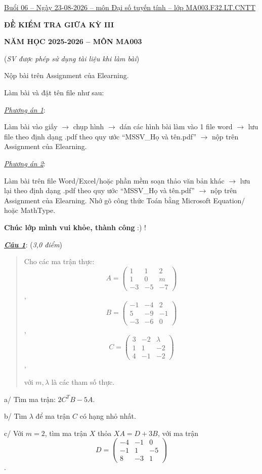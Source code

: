 \documentclass[12pt,a4paper]{article}
\newcommand{\ul}[1]{\uline{#1}}
\begin{document}
\ul{Buổi 06 -- Ngày 23-08-2026 -- môn Đại số tuyến tính -- lớp MA003.F32.LT.CNTT}

\textbf{ĐỀ KIỂM TRA GIỮA KỲ III}

\textbf{NĂM HỌC 2025-2026 -- MÔN MA003}

(\emph{SV được phép sử dụng tài liệu khi làm bài})

Nộp bài trên Assignment của Elearning.

Làm bài và đặt tên file như sau:

\emph{\ul{Phương án 1}}:

Làm bài vào giấy $\rightarrow$ chụp hình $\rightarrow$ dán các hình bài làm vào 1 file word $\rightarrow$
lưu file theo định dạng .pdf theo quy ước ``MSSV\_Họ và tên.pdf'' $\rightarrow$ nộp
trên Assignment của Elearning.

\emph{\ul{Phương án 2}}:

Làm bài trên file Word/Excel/hoặc phần mềm soạn thảo văn bản khác $\rightarrow$ lưu
lại theo định dạng .pdf theo quy ước ``MSSV\_Họ và tên.pdf'' $\rightarrow$ nộp trên
Assignment của Elearning. Nhớ gõ công thức Toán bằng Microsoft Equation/
hoặc MathType.

\textbf{Chúc lớp mình vui khỏe, thành công} :) !

\emph{\textbf{\ul{Câu 1}}}: (\emph{3,0 điểm})

\begin{quote}
Cho các ma trận thực: \[A = \begin{pmatrix} 1 & 1 & 2 \\ 1 & 0 & m \\ -3 & -5 & -7 \end{pmatrix}\],
\[B = \begin{pmatrix} -1 & -4 & 2 \\ 5 & -9 & -1 \\ -3 & -6 & 0 \end{pmatrix}\],
\[C = \begin{pmatrix} 3 & -2 & \lambda \\ 1 & 1 & -2 \\ 4 & -1 & -2 \end{pmatrix}\],

với $m, \lambda$ là các tham số
thực.
\end{quote}

a/ Tìm ma trận: $2C^T B - 5A$.

b/ Tìm $\lambda$ để ma trận
$C$ có hạng nhỏ nhất.

c/ Với $m = 2$, tìm ma trận
$X$ thỏa
$XA = D + 3B$, với ma trận
\[D = \begin{pmatrix} -4 & -1 & 0 \\ -1 & 1 & -5 \\ 8 & -3 & 1 \end{pmatrix}\].
\end{document}
